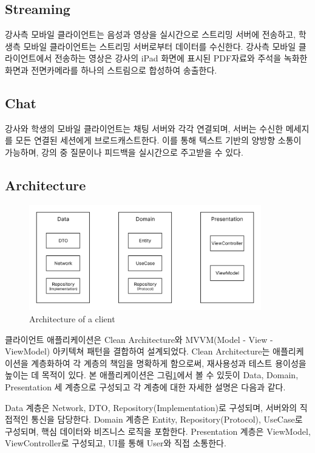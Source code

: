 \documentclass[pdflatex,sn-mathphys-num]{sn-jnl}%
\theoremstyle{thmstyleone}%
\theoremstyle{thmstyletwo}%
\theoremstyle{thmstylethree}%
\begin{document}
\subsection{Streaming}\label{subsec2}

강사측 모바일 클라이언트는 음성과 영상을 실시간으로 스트리밍 서버에 전송하고, 학생측 모바일 클라이언트는 스트리밍 서버로부터 데이터를 수신한다. 강사측 모바일 클라이언트에서 전송하는 영상은 강사의 iPad 화면에 표시된 PDF자료와 주석을 녹화한 화면과 전면카메라를 하나의 스트림으로 합성하여 송출한다.

\subsection{Chat}\label{subsec3}

강사와 학생의 모바일 클라이언트는 채팅 서버와 각각 연결되며, 서버는 수신한 메세지를 모든 연결된 세션에게 브로드캐스트한다. 이를 통해 텍스트 기반의 양방향 소통이 가능하며, 강의 중 질문이나 피드백을 실시간으로 주고받을 수 있다.

\subsection{Architecture}\label{subsec4}

\begin{figure}[h]
\centering
\includegraphics[width=0.9\textwidth]{architecture_of_client.png}
\caption{Architecture of a client}\label{fig2}
\end{figure}

클라이언트 애플리케이션은 Clean Architecture와 MVVM(Model - View - ViewModel) 아키텍쳐 패턴을 결합하여 설계되었다. Clean Architecture는 애플리케이션을 계층화하여 각 계층의 책임을 명확하게 함으로써, 재사용성과 테스트 용이성을 높이는 데 목적이 있다. 본 애플리케이션은 그림\ref{fig2}에서 볼 수 있듯이 Data, Domain, Presentation 세 계층으로 구성되고 각 계층에 대한 자세한 설명은 다음과 같다.

Data 계층은 Network, DTO, Repository(Implementation)로 구성되며, 서버와의 직접적인 통신을 담당한다. Domain 계층은 Entity, Repository(Protocol), UseCase로 구성되며, 핵심 데이터와 비즈니스 로직을 포함한다. Presentation 계층은 ViewModel, ViewController로 구성되고, UI를 통해 User와 직접 소통한다.
\end{document}
